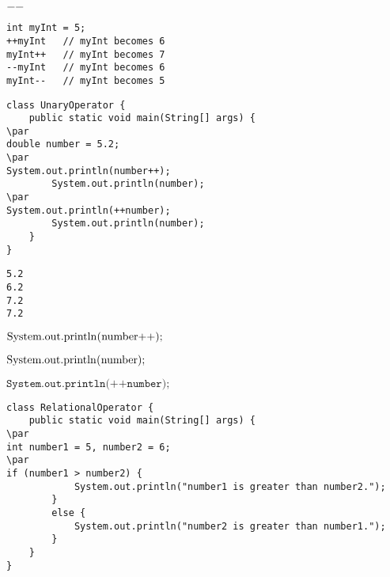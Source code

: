 \documentclass{book}
\def\lthtmlcheckvsize{\ifdim\ht\sizebox<\vsize 
  \ifdim\wd\sizebox<\hsize\expandafter\hfill\fi \expandafter\vfill
  \else\expandafter\vss\fi}%
\begin{document}
{\newpage\clearpage
{}%
$\lstinline{--}$%
\lthtmlindisplaymathZ
\lthtmlcheckvsize\clearpage}

{\newpage\clearpage
{}%
\begin{lstlisting}
int myInt = 5;
++myInt   // myInt becomes 6
myInt++   // myInt becomes 7
--myInt   // myInt becomes 6
myInt--   // myInt becomes 5
\end{lstlisting}%
\lthtmlfigureZ
\lthtmlcheckvsize\clearpage}

{\newpage\clearpage
{}%
\begin{lstlisting}
class UnaryOperator {
    public static void main(String[] args) {
\par
double number = 5.2;
\par
System.out.println(number++);
        System.out.println(number);
\par
System.out.println(++number);
        System.out.println(number);
    }
}
\end{lstlisting}%
\lthtmlfigureZ
\lthtmlcheckvsize\clearpage}

{\newpage\clearpage
{}%
\begin{lstlisting}
5.2
6.2
7.2
7.2
\end{lstlisting}%
\lthtmlfigureZ
\lthtmlcheckvsize\clearpage}

{\newpage\clearpage
{}%
$\lstinline{System.out.println(number++);}$%
\lthtmlindisplaymathZ
\lthtmlcheckvsize\clearpage}

{\newpage\clearpage
{}%
$\lstinline{System.out.println(number);}$%
\lthtmlindisplaymathZ
\lthtmlcheckvsize\clearpage}

{\newpage\clearpage
{}%
$\texttt{System.out.println(++number);}$%
\lthtmlindisplaymathZ
\lthtmlcheckvsize\clearpage}

{\newpage\clearpage
{}%
\begin{lstlisting}
class RelationalOperator {
    public static void main(String[] args) {
\par
int number1 = 5, number2 = 6;
\par
if (number1 > number2) {
            System.out.println("number1 is greater than number2.");
        }
        else {
            System.out.println("number2 is greater than number1.");
        }
    }
}
\end{lstlisting}%
\lthtmlfigureZ
\lthtmlcheckvsize\clearpage}
\end{document}
